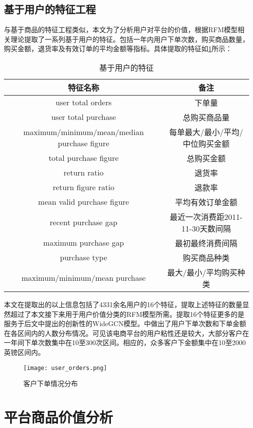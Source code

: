 \documentclass[lang=cn,11pt,a4paper,cite=authoryear]{elegantpaper}
\begin{document}
\subsection{基于用户的特征工程}
与基于商品的特征工程类似，本文为了分析用户对平台的价值，根据RFM模型相关理论提取了一系列基于用户的特征。包括一年内用户下单次数，购买商品数量，购买金额，退货率及有效订单的平均金额等指标。具体提取的特征如\ref{基于用户的特征}所示：
\begin{center}
\begin{longtable}{c|c}
    \caption{基于用户的特征}
    \label{基于用户的特征}\\
    \hline
      \textbf{特征名称} & \textbf{备注} \\
      \hline
      user total orders  & 下单量 \\
      user total purchase  & 总购买商品量 \\
      maximum/minimum/mean/median purchase figure & 每单最大/最小/平均/中位购买金额  \\
      total purchase figure   & 总购买金额 \\
      return ratio & 退货率 \\
      return figure ratio & 退款率 \\
      mean valid purchase figure & 平均有效订单金额 \\
      recent purchase gap & 最近一次消费距2011-11-30天数间隔 \\
      maximum purchase gap & 最初最终消费间隔 \\
      purchase type & 购买商品种类 \\
      maximum/minimum/mean purchase  & 最大/最小/平均购买种类 \\
      \hline
  \end{longtable}
\end{center}

本文在提取出的以上信息包括了4331余名用户的16个特征，提取上述特征的数量显然超过了本文接下来用于用户价值分类的RFM模型所需。提取16个特征更多的是服务于后文中提出的创新性的WideGCN模型。中做出了用户下单次数和下单金额在各区间内的人数分布情况。可见该电商平台的用户粘性还是较大，大部分客户在一年间下单次数集中在10至300次区间。相应的，众多客户下金额集中在10至2000英镑区间内。
\begin{figure}[H]
  \centering
  \texttt{[image: user\_orders.png]}
  \caption{客户下单情况分布}
  \label{客户下单情况分布}
\end{figure}

\section{平台商品价值分析}
\end{document}
